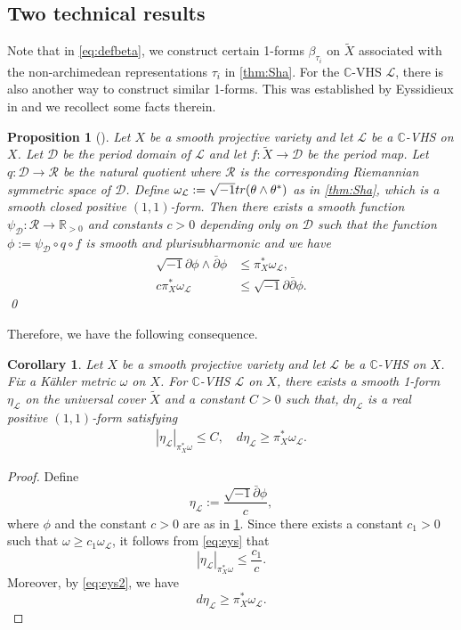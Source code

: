 \documentclass[11pt,a4paper,english]{smfart}
\theoremstyle{plain}
\newtheorem{proposition}[theorem]{Proposition}
\newtheorem{corollary}[theorem]{Corollary}
\theoremstyle{definition}
\theoremstyle{plain}
\def\hess{\sqrt{-1}\partial\bar{\partial}}
\def\db{\bar{\partial}}
\def\bR{\mathbb{R}}
\def\cR{\mathscr{R}}
\def\bC{\mathbb{C}}
\def\cD{\mathscr{D}}
\def\cL{\mathcal{L}}
\begin{document}
 	\subsection{Two technical results}
 	 	Note that in \eqref{eq:defbeta}, we construct certain  1-forms $\beta_{\tau_i}$ on $\widetilde{X}$ associated with the non-archimedean representations $\tau_i$   in \cref{thm:Sha}. For the $\bC$-VHS $\cL$, there is also another way to construct  similar 1-forms. This was established by Eyssidieux in \cite{Esy97} and we recollect some facts  therein. 
 	\begin{proposition}[]\label{prop:eys}
 		Let $X$ be a smooth projective variety and let $\cL$ be a $\bC$-VHS on $X$. Let $\cD$ be the period domain of $\cL$ and let $f:\widetilde{X}\to \cD$ be the period map. Let $q:\cD\to \cR$ be the natural quotient where $\cR$ is the corresponding Riemannian symmetric space of $\cD$. Define $\omega_\cL:=\sqrt{-1}{\rm tr}(\theta\wedge\theta^*)$ as in \cref{thm:Sha}, which is a smooth closed positive $(1,1)$-form. Then there exists a smooth  function $\psi_{\cD}:\cR\to \bR_{>0}$ and  constants $c>0$   depending  only on $\cD$  such that  the function $\phi:=\psi_{\cD}\circ q\circ f$ is smooth and plurisubharmonic and we have
 		\begin{align}\label{eq:eys}
 			\sqrt{-1}\partial\phi\wedge\db\phi&\leq \pi_X^*\omega_\cL,\\\label{eq:eys2}
 			c\pi_X^*\omega_\cL&\leq 	\hess \phi.
 		\end{align}  \qed
 	\end{proposition} 
 	Therefore, we have the following consequence.
 	\begin{corollary}\label{cor:eta}
	Let $X$ be a smooth projective variety and let $\cL$ be a $\bC$-VHS on $X$. Fix a Kähler metric $\omega$ on $X$. For  $\bC$-VHS $\cL$ on $X$, there exists a smooth 1-form $\eta_\cL$ on the universal cover $\widetilde{X}$ and a constant $C > 0$ such that, $d\eta_\cL$ is a real positive $(1,1)$-form satisfying
 \begin{align}
	|\eta_\cL|_{\pi_X^*\omega} \leq C, \quad d\eta_\cL \geq \pi_X^*\omega_\cL.
\end{align}  
\end{corollary}
\begin{proof}
	Define
	\[
	\eta_\cL := \frac{\sqrt{-1}  \db \phi}{c},
	\]
	where $\phi$ and the constant $c > 0$ are as in \cref{prop:eys}. Since there exists a constant $c_1 > 0$ such that $\omega \geq c_1 \omega_\cL$, it follows from \eqref{eq:eys} that
	\[
	|\eta_\cL|_{\pi_X^*\omega} \leq \frac{c_1}{c}.
	\]
	Moreover, by \eqref{eq:eys2}, we have
	\[
	d\eta_\cL \geq \pi_X^*\omega_\cL.
	\]
\end{proof}
\end{document}
